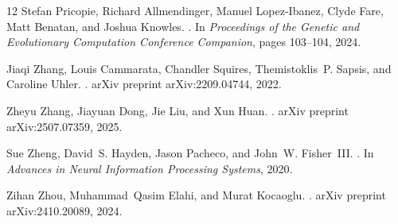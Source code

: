 \documentclass[10pt]{article}
\begin{document}
\begin{thebibliography}{12}
Stefan Pricopie, Richard Allmendinger, Manuel Lopez-Ibanez, Clyde Fare, Matt
  Benatan, and Joshua Knowles.
.
\newblock In {\em Proceedings of the Genetic and Evolutionary Computation
  Conference Companion}, pages 103--104, 2024.

Jiaqi Zhang, Louis Cammarata, Chandler Squires, Themistoklis~P. Sapsis, and
  Caroline Uhler.
.
\newblock arXiv preprint arXiv:2209.04744, 2022.

Zheyu Zhang, Jiayuan Dong, Jie Liu, and Xun Huan.
.
\newblock arXiv preprint arXiv:2507.07359, 2025.

Sue Zheng, David~S. Hayden, Jason Pacheco, and John~W. Fisher~III.
.
\newblock In {\em Advances in Neural Information Processing Systems}, 2020.

Zihan Zhou, Muhammad~Qasim Elahi, and Murat Kocaoglu.
.
\newblock arXiv preprint arXiv:2410.20089, 2024.

\end{thebibliography}
\end{document}
